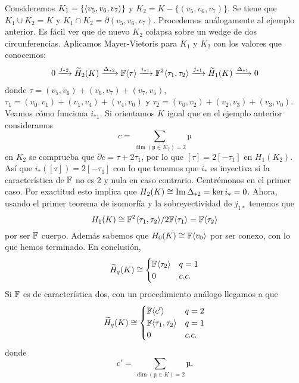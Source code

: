 \documentclass[HS.tex]{subfiles}
\begin{document}
\begin{ej}
Consideremos $K_1=\{\langle{v_5,v_6,v_7}\rangle\}$ y $K_2=K-\{(v_5,v_6,v_7)\}$. Se tiene que $K_1\cup K_2=K$ y $K_1\cap K_2=\partial(v_5,v_6,v_7)$. Procedemos análogamente al ejemplo anterior. Es fácil ver que de nuevo $K_2$ colapsa sobre un wedge de dos circunferencias. Aplicamos Mayer-Vietoris para $K_1$ y $K_2$ con los valores que conocemos:
\begin{align*}
 0 \xrightarrow{j_{*2}} \widetilde{H}_2(K) \xrightarrow{\Delta_{*2}} \mathbb{F}\langle{\tau}\rangle
 \xrightarrow{i_{*1}} \mathbb{F}^2\langle{\tau_1,\tau_2}\rangle \xrightarrow{j_{*1}} \widetilde{H}_1(K) \xrightarrow{\Delta_{*1}} 0 
\end{align*}
donde $\tau=(v_5,v_6)+(v_6,v_7)+(v_7,v_5)$, $\tau_1=(v_0,v_1)+(v_1,v_4)+(v_4,v_0)$ y $\tau_2=(v_0,v_2)+(v_2,v_3)+(v_3,v_0)$. Veamos cómo funciona $i_{*1}$. Si orientamos $K$ igual que en el ejemplo anterior consideramos 
\[ c = \sum_{\dim(µ \in K_2)=2} µ \]
en $K_2$ se comprueba que $\partial c=\tau+2\tau_1$, por lo que $[\tau]=2[-\tau_1]$ en $H_1(K_2)$. Así que $i_*([\tau])=2[-\tau_1]$ con lo que tenemos que  $i_*$ es inyectiva si la característica de $\mathbb{F}$ no es 2 y nula en caso contrario. Centrémonos en el primer caso. Por exactitud esto implica que $H_2(K)\cong\operatorname{Im}\Delta_{*2}=\ker i_*=0$. Ahora, usando el primer teorema de isomorfía y la sobreyectividad de $j_{1*}$ tenemos que
\[
H_1(K)\cong \mathbb{F}^2\langle{\tau_1,\tau_2}\rangle/2\mathbb{F}\langle{\tau_1}\rangle=\mathbb{F}\langle{\tau_2}\rangle
\]
por ser $\mathbb{F}$ cuerpo. Además sabemos que $H_0(K)\cong\mathbb{F}\langle{v_0}\rangle$ por ser conexo, con lo que hemos terminado. En conclusión, 
$$\widetilde{H}_q(K)\cong \begin{cases}
\mathbb{F}\langle{\tau_2}\rangle & q=1\\
0 & c.c.
\end{cases}$$
Si $\mathbb{F}$ es de característica dos, con un procedimiento análogo llegamos a que
$$\widetilde{H}_q(K)\cong \begin{cases}
\mathbb{F}\langle{c'}\rangle & q=2\\
\mathbb{F}\langle{\tau_1,\tau_2}\rangle & q=1\\
0 & c.c.
\end{cases}$$
donde \[ c' = \sum_{\dim(µ \in K)=2} µ. \]
\end{ej}
\end{document}
